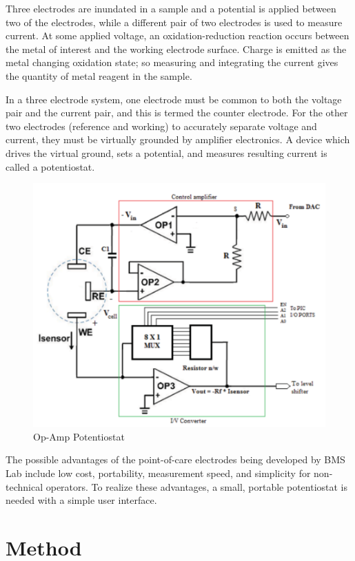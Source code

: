 \documentclass[DIV=calc, paper=letterpaper, fontsize=11pt, twocolumn]{scrartcl}	 %
\begin{document}
Three electrodes are inundated in a sample and a potential is applied between two of the electrodes, while
a different pair of two electrodes is used to measure current.
At some applied voltage, an oxidation-reduction reaction occurs between the metal of interest and the working electrode surface.
Charge is emitted as the metal changing oxidation state;
so measuring and integrating the current gives the quantity of metal reagent in the sample.

In a three electrode system, one electrode must be common to both the voltage pair and the current pair,
and this is termed the counter electrode.
For the other two electrodes (reference and working) to accurately separate voltage and current,
they must be virtually grounded by amplifier electronics.
A device which drives the virtual ground, sets a potential, and measures resulting current is called a potentiostat.

\begin{figure}[ht]
\centering
\includegraphics[width=0.9\columnwidth]{zinc-paper-potentiostat}
\caption{Op-Amp Potentiostat \cite{zinc-masters-defense}}
\end{figure}

The possible advantages of the point-of-care electrodes being developed by BMS Lab include
low cost, portability, measurement speed, and simplicity for non-technical operators.
To realize these advantages, a small, portable potentiostat is needed with a simple user interface.

\newpage

\section*{Method}
\end{document}
